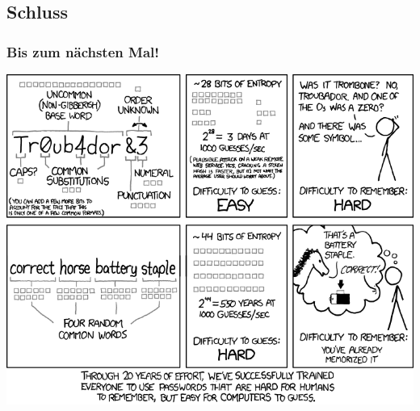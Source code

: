 \subsection{Schluss}
\begin{frame}
\frametitle{Bis zum nächsten Mal!}
\begin{center}
	\includegraphics[height=0.85\textheight]{images/password_strength_936}
\end{center}
\end{frame}

